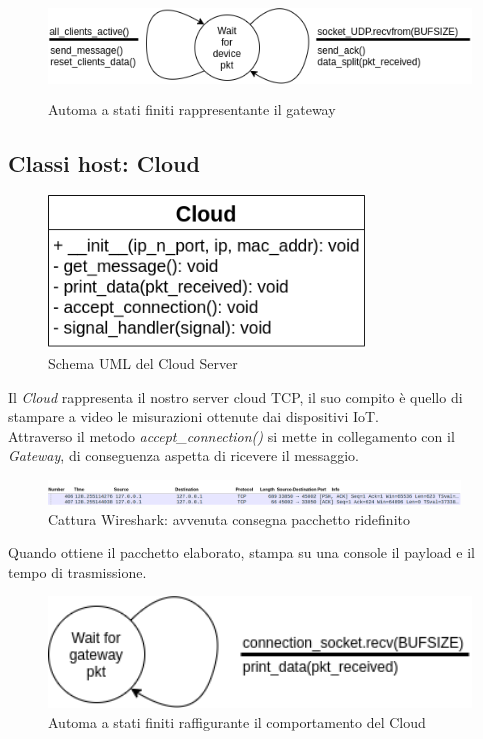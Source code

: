\documentclass[a4paper,12pt]{report}
\begin{document}
\begin{figure}[H]
    \centering
    \includegraphics[width=\textwidth,height=7em]{img/FSM_Gateway.png}
    \caption{Automa a stati finiti rappresentante il gateway}
    \label{img:fsm_gateway}
\end{figure}
%
\subsection{Classi host: Cloud}
\begin{figure}[H]
    \centering
    \includegraphics[width=.7\textwidth,height=11em]{img/UML_Cloud.png}
    \caption{Schema UML del Cloud Server}
    \label{img:3}
\end{figure}

Il \emph{Cloud} rappresenta il nostro server cloud TCP, il suo compito è quello di stampare a video le misurazioni ottenute dai dispositivi IoT.
\\
Attraverso il metodo \emph{accept\_connection()} si mette in collegamento con il \emph{Gateway}, di conseguenza aspetta di ricevere il messaggio.
\begin{figure}[H]
    \centering{}
    \includegraphics[width=\textwidth,height=25]{img/gateway_send.png}
    \caption{Cattura Wireshark: avvenuta consegna pacchetto ridefinito}
    \label{img:gatewaysend}
\end{figure}
Quando ottiene il pacchetto elaborato, stampa su una console il payload e il tempo di trasmissione.
\begin{figure}[H]
    \centering{}
    \includegraphics[width=.9\textwidth,height=8em]{img/FSM_Cloud.png}
    \caption{Automa a stati finiti raffigurante il comportamento del Cloud}
    \label{img:fsm_cloud}
\end{figure}
\end{document}
